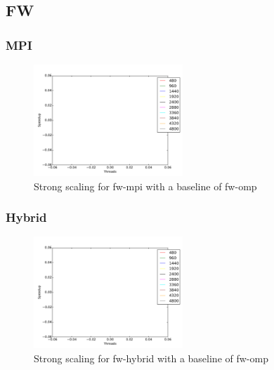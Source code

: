 \subsection{FW}

\subsubsection{MPI}

\begin{figure}[ht]
\centering
\includegraphics[width=0.5\textwidth]{plots/strong_fw-mpi_baseline-fw-omp--1.pdf}
\caption{Strong scaling for fw-mpi with a baseline of fw-omp}
\label{strong-fw-mpi}
\end{figure}

\subsubsection{Hybrid}

\begin{figure}[ht]
\centering
\includegraphics[width=0.5\textwidth]{plots/strong_fw-hybrid_baseline-fw-omp--1.pdf}
\caption{Strong scaling for fw-hybrid with a baseline of fw-omp}
\label{strong-fw-mpi}
\end{figure}

